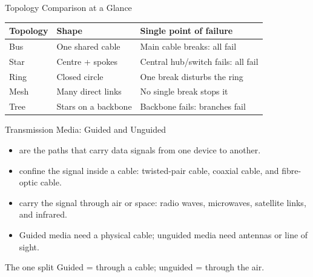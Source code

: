 \documentclass[aspectratio=169]{beamer}
\begin{document}
\begin{frame}{Topology Comparison at a Glance}
  \begin{center}
    \begin{tabular}{p{}p{}p{}}
      \toprule
      \textbf{Topology} & \textbf{Shape} & \textbf{Single point of failure} \\
      \midrule
      Bus & One shared cable & Main cable breaks: all fail \\
      Star & Centre + spokes & Central hub/switch fails: all fail \\
      Ring & Closed circle & One break disturbs the ring \\
      Mesh & Many direct links & No single break stops it \\
      Tree & Stars on a backbone & Backbone fails: branches fail \\
      \bottomrule
    \end{tabular}
  \end{center}
  \vspace{0.25cm}
\end{frame}

\begin{frame}{Transmission Media: Guided and Unguided}
  \begin{itemize}
    \item {} are the paths that carry data signals
      from one device to another.
    \item {} confine the signal inside a cable:
      twisted-pair cable, coaxial cable, and fibre-optic cable.
    \item {} carry the signal through air or
      space: radio waves, microwaves, satellite links, and infrared.
    \item Guided media need a physical cable; unguided media need antennas
      or line of sight.
  \end{itemize}
  \begin{block}{The one split}
    Guided = through a cable; unguided = through the air.
  \end{block}
\end{frame}
\end{document}
